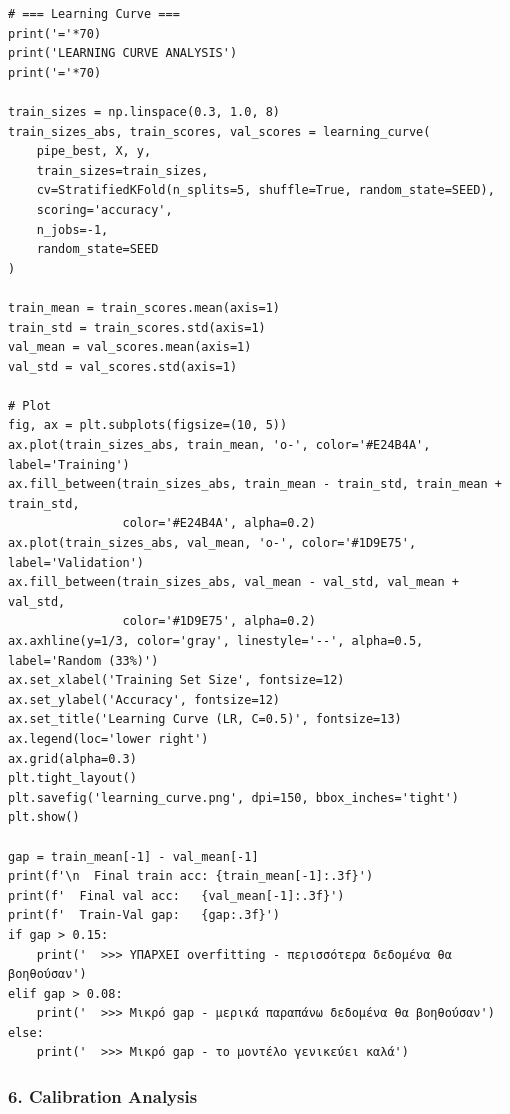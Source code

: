 \begin{lstlisting}
# === Learning Curve ===
print('='*70)
print('LEARNING CURVE ANALYSIS')
print('='*70)
 
train_sizes = np.linspace(0.3, 1.0, 8)
train_sizes_abs, train_scores, val_scores = learning_curve(
    pipe_best, X, y,
    train_sizes=train_sizes,
    cv=StratifiedKFold(n_splits=5, shuffle=True, random_state=SEED),
    scoring='accuracy',
    n_jobs=-1,
    random_state=SEED
)
 
train_mean = train_scores.mean(axis=1)
train_std = train_scores.std(axis=1)
val_mean = val_scores.mean(axis=1)
val_std = val_scores.std(axis=1)
 
# Plot
fig, ax = plt.subplots(figsize=(10, 5))
ax.plot(train_sizes_abs, train_mean, 'o-', color='#E24B4A', label='Training')
ax.fill_between(train_sizes_abs, train_mean - train_std, train_mean + train_std,
                color='#E24B4A', alpha=0.2)
ax.plot(train_sizes_abs, val_mean, 'o-', color='#1D9E75', label='Validation')
ax.fill_between(train_sizes_abs, val_mean - val_std, val_mean + val_std,
                color='#1D9E75', alpha=0.2)
ax.axhline(y=1/3, color='gray', linestyle='--', alpha=0.5, label='Random (33%)')
ax.set_xlabel('Training Set Size', fontsize=12)
ax.set_ylabel('Accuracy', fontsize=12)
ax.set_title('Learning Curve (LR, C=0.5)', fontsize=13)
ax.legend(loc='lower right')
ax.grid(alpha=0.3)
plt.tight_layout()
plt.savefig('learning_curve.png', dpi=150, bbox_inches='tight')
plt.show()
 
gap = train_mean[-1] - val_mean[-1]
print(f'\n  Final train acc: {train_mean[-1]:.3f}')
print(f'  Final val acc:   {val_mean[-1]:.3f}')
print(f'  Train-Val gap:   {gap:.3f}')
if gap > 0.15:
    print('  >>> ΥΠΑΡΧΕΙ overfitting - περισσότερα δεδομένα θα βοηθούσαν')
elif gap > 0.08:
    print('  >>> Μικρό gap - μερικά παραπάνω δεδομένα θα βοηθούσαν')
else:
    print('  >>> Μικρό gap - το μοντέλο γενικεύει καλά')
\end{lstlisting}
 
\subsubsection*{6. Calibration Analysis}
 
